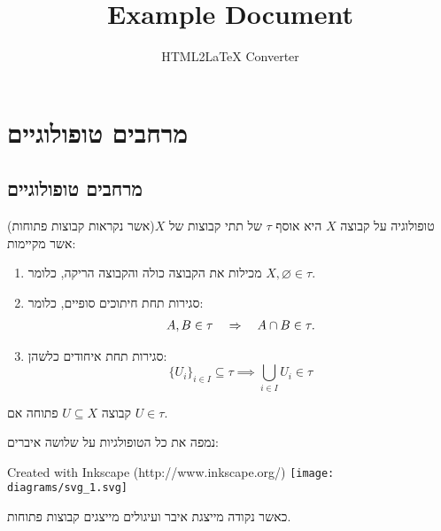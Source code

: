 \documentclass{tstextbook}
\begin{document}
\title{Example Document}
\author{HTML2LaTeX Converter}
\maketitle

\chapter{מרחבים טופולוגיים}

\section{מרחבים טופולוגיים}

\begin{definition}[טופולוגיה]
טופולוגיה על קבוצה \(X\) היא אוסף \(\tau\) של תתי קבוצות של \(X\)(אשר נקראות קבוצות פתוחות) אשר מקיימות:

  \begin{enumerate}
    \item מכילות את הקבוצה כולה והקבוצה הריקה, כלומר \(X,\varnothing  \in \tau\). 


    \item סגירות תחת חיתוכים סופיים, כלומר: 
$$\begin{array}{r l}{A,B\in\tau}&{{}\Rightarrow\quad A\cap B\in\tau.}\end{array}$$


    \item סגירות תחת איחודים כלשהן: 
$$\{U_{i}\}_{i\in I}\subseteq\tau\implies\bigcup_{i\in I}U_{i}\in\tau$$


  \end{enumerate}
\end{definition}
\begin{definition}
קבוצה \(U\subseteq X\) פתוחה אם \(U\in \tau\).

\end{definition}
\begin{example}
נמפה את כל הטופולגיות על שלושה איברים:

 Created with Inkscape (http://www.inkscape.org/) \texttt{[image: diagrams/svg\_1.svg]}
\end{example}
כאשר נקודה מייצגת איבר ועיגולים מייצגים קבוצות פתוחות. 
\end{document}
